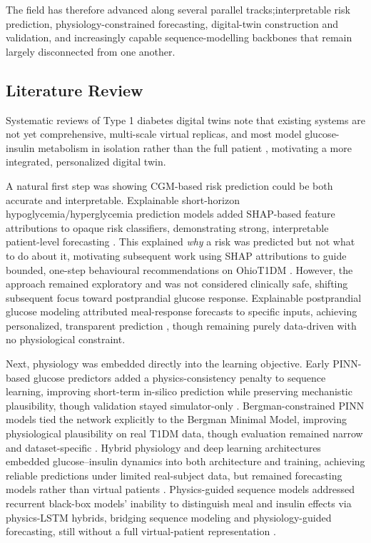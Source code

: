 \documentclass[journal]{IEEEtran}
\begin{document}
The field has therefore advanced along several parallel tracks;interpretable risk prediction, physiology-constrained forecasting, digital-twin construction and validation, and increasingly capable sequence-modelling backbones that remain largely disconnected from one another.

\subsection{Literature Review}

Systematic reviews of Type 1 diabetes digital twins note that existing systems are not yet comprehensive, multi-scale virtual replicas, and most model glucose-insulin metabolism in isolation rather than the full patient \cite{ref2}, motivating a more integrated, personalized digital twin.

A natural first step was showing CGM-based risk prediction could be both accurate and interpretable. Explainable short-horizon hypoglycemia/hyperglycemia prediction models added SHAP-based feature attributions to opaque risk classifiers, demonstrating strong, interpretable patient-level forecasting \cite{ref3}. This explained \emph{why} a risk was predicted but not what to do about it, motivating subsequent work using SHAP attributions to guide bounded, one-step behavioural recommendations on OhioT1DM \cite{ref6}. However, the approach remained exploratory and was not considered clinically safe, shifting subsequent focus toward postprandial glucose response. Explainable postprandial glucose modeling attributed meal-response forecasts to specific inputs, achieving personalized, transparent prediction \cite{ref7}, though remaining purely data-driven with no physiological constraint.

Next, physiology was embedded directly into the learning objective. Early PINN-based glucose predictors added a physics-consistency penalty to sequence learning, improving short-term in-silico prediction while preserving mechanistic plausibility, though validation stayed simulator-only \cite{ref9}. Bergman-constrained PINN models tied the network explicitly to the Bergman Minimal Model, improving physiological plausibility on real T1DM data, though evaluation remained narrow and dataset-specific \cite{ref10}. Hybrid physiology and deep learning architectures embedded glucose--insulin dynamics into both architecture and training, achieving reliable predictions under limited real-subject data, but remained forecasting models rather than virtual patients \cite{ref11}. Physics-guided sequence models addressed recurrent black-box models' inability to distinguish meal and insulin effects via physics-LSTM hybrids, bridging sequence modeling and physiology-guided forecasting, still without a full virtual-patient representation \cite{ref12}.
\end{document}
